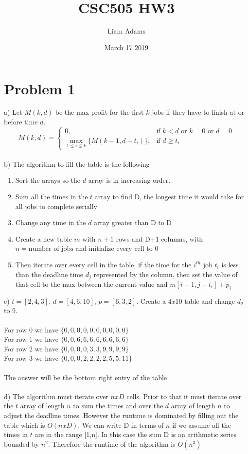 \documentclass{article}
\title{CSC505 HW3}
\author{Liam Adams}
\date{March 17 2019}
\begin{document}
\maketitle

\section*{Problem 1}
a) Let $M(k,d)$ be the max profit for the first $k$ jobs if they have to finish at or before time $d$.
\[
    M(k,d)= 
\begin{cases}
    0,& \text{if } k<d \text{ or } k=0 \text{ or } d=0\\
    \max_{1\leq i \leq k}\{M(k-1, d-t_i)\}, & \text{if } d\geq t_i
\end{cases}
\]\\
b) The algorithm to fill the table is the following
\begin{enumerate}
  \item Sort the arrays so the $d$ array is in increasing order.
  \item Sum all the times in the $t$ array to find D, the longest time it would take for all jobs to complete serially
  \item Change any time in the $d$ array greater than D to D
  \item Create a new table $m$ with $n+1$ rows and D+1 columns, with $n=\text{number of jobs}$ and initialize every cell to 0
  \item Then iterate over every cell in the table, if the time for the $i^{th}$ job $t_i$ is less than the deadline time $d_j$ represented by the column, then set the value of that cell to the max between the current value and $m[i-1, j-t_i] + p_i$
\end{enumerate}
c) $t=[2, 4, 3]$, $d=[4, 6, 10]$, $p=[6, 3, 2]$. Create a $4x10$ table and change $d_2$ to 9.\\\\
For row 0 we have $\{0,0,0,0,0,0,0,0,0,0\}$\\
For row 1 we have $\{0,0,6,6,6,6,6,6,6,6\}$\\
For row 2 we have $\{0,0,0,0,3,3,9,9,9,9\}$\\
For row 3 we have $\{0,0,0,2,2,2,2,5,5,11\}$\\\\
The answer will be the bottom right entry of the table\\\\
d) The algorithm must iterate over $nxD$ cells. Prior to that it must iterate over the $t$ array of length $n$ to sum the times and over the $d$ array of length $n$ to adjust the deadline times.  However the runtime is dominated by filling out the table which is $O(nxD)$.  We can write D in terms of $n$ if we assume all the times in $t$ are in the range [1,n]. In this case the sum D is an arithmetic series bounded by $n^2$.  Therefore the runtime of the algorithm is $O(n^3)$
\end{document}
